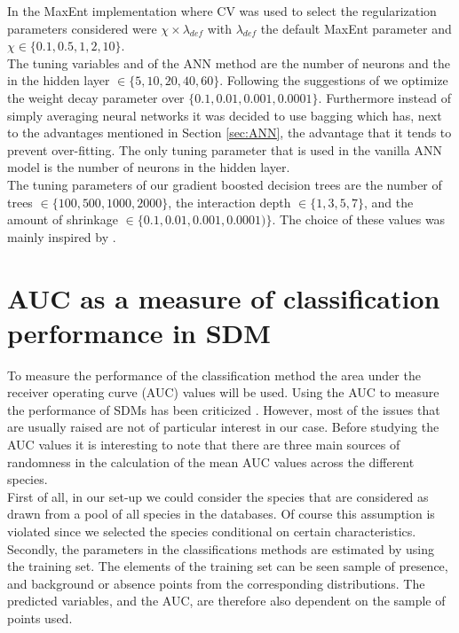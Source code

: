 In the MaxEnt implementation where CV was used to select the regularization parameters considered were $\chi \times \lambda_{def}$ with $\lambda_{def}$ the default MaxEnt parameter and $\chi \in \{0.1,0.5,1,2,10\}$. \\

The tuning variables and of the ANN method are the number of neurons and the in the hidden layer $\in \{ 5,10,20,40,60 \}$. Following the suggestions of \cite{venables_modern_2002} we optimize the weight decay parameter over $\{0.1,0.01,0.001,0.0001\}$. Furthermore instead of simply averaging neural networks it was decided to use bagging which has, next to the advantages mentioned in Section \ref{sec:ANN}, the advantage that it tends to prevent over-fitting. The only tuning parameter that is used in the vanilla ANN model is the number of neurons in the hidden layer. \\

The tuning parameters of our gradient boosted decision trees are the number of trees $\in \{ 100,500,1000,2000\}$, the interaction depth $\in \{ 1,3,5,7\}$, and the amount of shrinkage $\in  \{0.1,0.01,0.001,0.0001)\}$. The choice of these values was mainly inspired by \cite{elith_working_2008}. \\

\section{AUC as a measure of classification performance in SDM}
\label{sec:AUC}
To measure the performance of the classification method the area under the receiver operating curve (AUC) values will be used. Using the AUC to measure the performance of SDMs has been criticized \parencite{lobo_auc:_2008, jimenez-valverde_insights_2012}. However, most of the issues that are usually raised are not of particular interest in our case. Before studying the AUC values it is interesting to note that there are three main sources of randomness in the calculation of the mean AUC values across the different species. \\ 

First of all, in our set-up we could consider the species that are considered as drawn from a pool of all species in the databases. Of course this assumption is violated since we selected the species conditional on certain characteristics.  \\

Secondly, the parameters in the classifications methods are estimated by using the training set. The elements of the training set can be seen sample of presence, and background or absence points from the corresponding distributions. The predicted variables, and the AUC, are therefore also dependent on the sample of points used. \\

